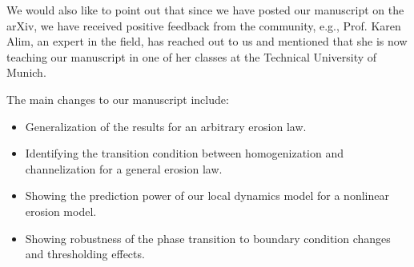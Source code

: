 \documentclass[11pt]{harvardletter}
\begin{document}
\begin{letter}{}
We would also like to point out that since we have posted our manuscript on the arXiv, we have received positive feedback from the community, e.g., Prof. Karen Alim, an expert in the field, has reached out to us and mentioned that she is now teaching our manuscript in one of her classes at the Technical University of Munich. 


The main changes to our manuscript include:
%
\begin{itemize}
    \item Generalization of the results for an arbitrary erosion law.
    \item Identifying the transition condition between homogenization and channelization for a general erosion law.
    \item Showing the prediction power of our local dynamics model for a nonlinear erosion model.
    \item Showing robustness of the phase transition to boundary condition changes and thresholding effects.
\end{itemize}








\end{letter}
\end{document}
